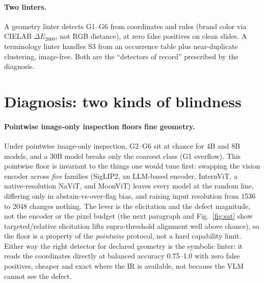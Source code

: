 \documentclass[10pt]{article}
\newcommand{\g}[1]{\textsf{#1}}        %
\begin{document}
\paragraph{Two linters.}
A geometry linter detects \g{G1}--\g{G6} from coordinates and rules (brand color via CIELAB $\Delta E_{2000}$, not RGB
distance), at zero false positives on clean slides. A terminology linter handles \g{S3} from an occurrence
table plus near-duplicate clustering, image-free. Both are the ``detectors of record'' prescribed by the diagnosis.

\section{Diagnosis: two kinds of blindness}\label{sec:diag}

\paragraph{Pointwise image-only inspection floors fine geometry.}
Under pointwise image-only inspection, \g{G2}--\g{G6} sit at chance for 4B and 8B models, and a 30B model breaks
only the coarsest class (\g{G1} overflow). This pointwise floor is invariant to the things one would tune first:
swapping the vision encoder across \emph{five} families (SigLIP2, an LLM-based encoder, InternViT, a
native-resolution NaViT, and MoonViT) leaves every model at the random line, differing only in
abstain-vs-over-flag bias, and raising input resolution from 1536 to 2048 changes nothing. The lever is the
elicitation and the defect magnitude, not the encoder or the pixel budget (the next paragraph and
Fig.~\ref{fig:sat} show targeted/relative elicitation lifts supra-threshold alignment well above chance), so
the floor is a property of the \emph{pointwise} protocol, not a hard capability limit. Either way the right
detector for declared geometry is the symbolic linter: it reads the coordinates directly at balanced accuracy
0.75--1.0 with zero false positives, cheaper and exact where the IR is available, not because the VLM cannot
see the defect.
\end{document}
